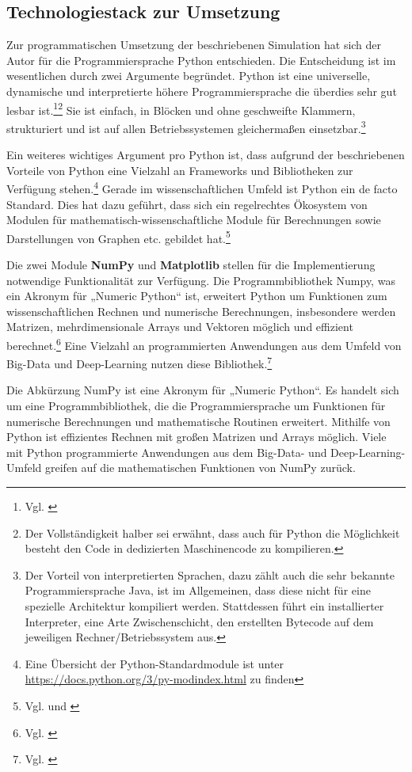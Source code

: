 \documentclass[12pt]{article}
\begin{document}
\subsection{Technologiestack zur Umsetzung}
Zur programmatischen Umsetzung der beschriebenen Simulation hat sich der Autor für die Programmiersprache Python entschieden. Die Entscheidung ist im wesentlichen durch zwei Argumente begründet. Python ist eine universelle, dynamische und interpretierte höhere Programmiersprache die überdies sehr gut lesbar ist.\footnote{Vgl. \cite{PythonGoodFor}}\footnote{Der Vollständigkeit halber sei erwähnt, dass auch für Python die Möglichkeit besteht den Code in dedizierten Maschinencode zu kompilieren.} Sie ist einfach, in Blöcken und ohne geschweifte Klammern, strukturiert und ist auf allen Betriebssystemen gleichermaßen einsetzbar.\footnote{Der Vorteil von interpretierten Sprachen, dazu zählt auch die sehr bekannte Programmiersprache Java, ist im Allgemeinen, dass diese nicht für eine spezielle Architektur kompiliert werden. Stattdessen führt ein installierter Interpreter, eine Arte Zwischenschicht, den erstellten Bytecode auf dem jeweiligen Rechner/Betriebssystem aus.}

Ein weiteres wichtiges Argument pro Python ist, dass aufgrund der beschriebenen Vorteile von Python eine Vielzahl an Frameworks und Bibliotheken zur Verfügung stehen.\footnote{Eine Übersicht der Python-Standardmodule ist unter \url{https://docs.python.org/3/py-modindex.html} zu finden} Gerade im wissenschaftlichen Umfeld ist Python ein de facto Standard. Dies hat dazu geführt, dass sich ein regelrechtes Ökosystem von Modulen für mathematisch-wissenschaftliche Module für Berechnungen sowie Darstellungen von Graphen etc. gebildet hat.\footnote{Vgl. \cite{scipy} und \cite{dataquest}} 

Die zwei Module \textbf{NumPy} und \textbf{Matplotlib} stellen für die Implementierung notwendige Funktionalität zur Verfügung. Die Programmbibliothek Numpy, was ein Akronym für „Numeric Python“ ist, erweitert Python um Funktionen zum wissenschaftlichen Rechnen und numerische Berechnungen, insbesondere werden Matrizen, mehrdimensionale Arrays und Vektoren möglich und effizient berechnet.\footnote{Vgl. \cite{numpy}} Eine Vielzahl an programmierten Anwendungen aus dem Umfeld von Big-Data und Deep-Learning nutzen diese Bibliothek.\footnote{Vgl. \cite{bigdata}}


Die Abkürzung NumPy ist eine Akronym für „Numeric Python“. Es handelt sich um eine Programmbibliothek, die die Programmiersprache um Funktionen für numerische Berechnungen und mathematische Routinen erweitert. Mithilfe von Python ist effizientes Rechnen mit großen Matrizen und Arrays möglich. Viele mit Python programmierte Anwendungen aus dem Big-Data- und Deep-Learning-Umfeld greifen auf die mathematischen Funktionen von NumPy zurück.
\end{document}
